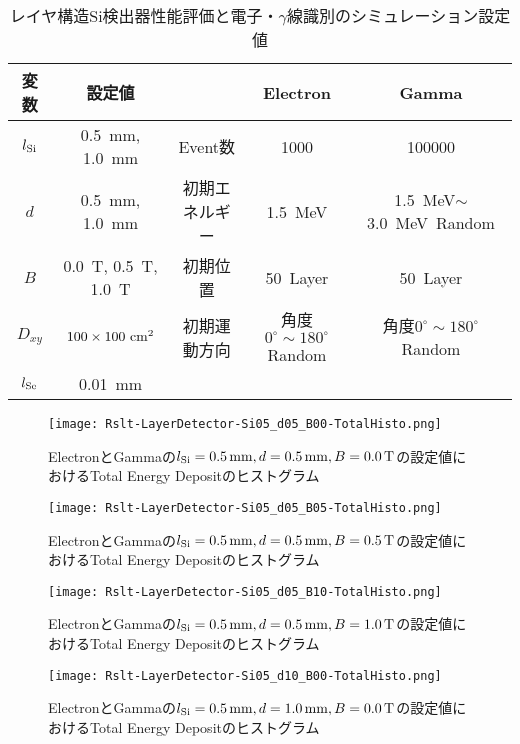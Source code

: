 \documentclass[a4paper,10pt]{jreport}
\begin{document}
\begin{table}[H] 
	\center
	\caption{レイヤ構造Si検出器性能評価と電子・$\gamma$線識別のシミュレーション設定値} \label{Tab-LayerDetectorDpendence}
	\begin{tabular}{|cc||c|cc|}
		\hline
		変数 & 設定値 & & Electron & Gamma\\
		\hline
		$l_{\rm{Si}}$ &  \SI{0.5}{mm}, \SI{1.0}{mm} &Event数 & 1000 & 100000 \\ 
		$d$ & \SI{0.5}{mm}, \SI{1.0}{mm} & 初期エネルギー &
		 \SI{1.5}{MeV} & \SI{1.5}{MeV}$\sim$\SI{3.0}{MeV}\ Random \\
		$B$ & \SI{0.0}{T}, \SI{0.5}{T}, \SI{1.0}{T} & 初期位置 & \SI{50}{Layer} & \SI{50}{Layer} \\
		$D_{xy}$ & $100\times100\ \rm{cm}^2$ & 初期運動方向 & 
		角度$0^{\circ}\sim180^{\circ}$Random & 角度$0^{\circ}\sim180^{\circ}$Random \\
		$l_{\rm{Se}}$ & \SI{0.01}{mm} & & & \\
		\hline
	\end{tabular}
\end{table}

\begin{figure}[H]
	\center
	\texttt{[image: Rslt-LayerDetector-Si05\_d05\_B00-TotalHisto.png]}
	\caption{ElectronとGammaの$l_{\rm{Si}}=\SI{0.5}{mm}, d=\SI{0.5}{mm}, B=\SI{0.0}{T}$の設定値におけるTotal Energy Depositのヒストグラム}
	\label{Rslt-LayerDetector-Si05_d05_B00-TotalHisto}
\end{figure}

\begin{figure}[H]
	\center
	\texttt{[image: Rslt-LayerDetector-Si05\_d05\_B05-TotalHisto.png]}
	\caption{ElectronとGammaの$l_{\rm{Si}}=\SI{0.5}{mm}, d=\SI{0.5}{mm}, B=\SI{0.5}{T}$の設定値におけるTotal Energy Depositのヒストグラム}
	\label{Rslt-LayerDetector-Si05_d05_B05-TotalHisto}
\end{figure}

\begin{figure}[H]
	\center
	\texttt{[image: Rslt-LayerDetector-Si05\_d05\_B10-TotalHisto.png]}
	\caption{ElectronとGammaの$l_{\rm{Si}}=\SI{0.5}{mm}, d=\SI{0.5}{mm}, B=\SI{1.0}{T}$の設定値におけるTotal Energy Depositのヒストグラム}
	\label{Rslt-LayerDetector-Si05_d05_B10-TotalHisto}
\end{figure}

\begin{figure}[H]
	\center
	\texttt{[image: Rslt-LayerDetector-Si05\_d10\_B00-TotalHisto.png]}
	\caption{ElectronとGammaの$l_{\rm{Si}}=\SI{0.5}{mm}, d=\SI{1.0}{mm}, B=\SI{0.0}{T}$の設定値におけるTotal Energy Depositのヒストグラム}
	\label{Rslt-LayerDetector-Si05_d10_B00-TotalHisto}
\end{figure}
\end{document}
